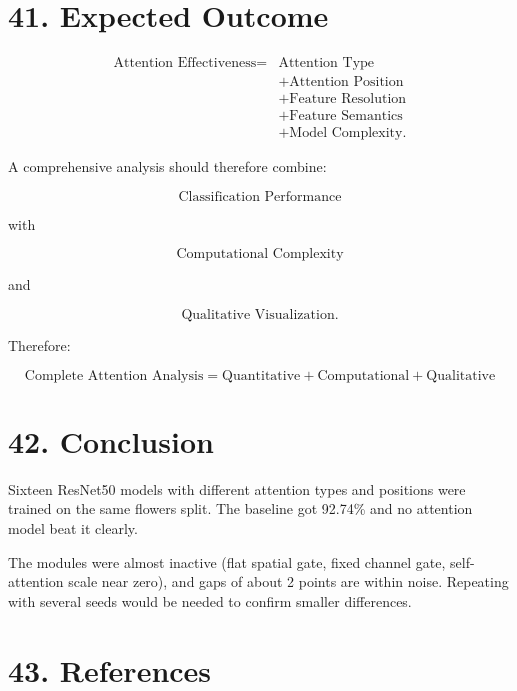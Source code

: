\documentclass[10pt]{article}
\begin{document}
\section*{41. Expected Outcome}

\[
\boxed{
\begin{aligned}
\text{Attention Effectiveness}
={}&
\text{Attention Type}\\
&+
\text{Attention Position}\\
&+
\text{Feature Resolution}\\
&+
\text{Feature Semantics}\\
&+
\text{Model Complexity}.
\end{aligned}
}
\]

A comprehensive analysis should therefore combine:

\[
\boxed{
\text{Classification Performance}
}
\]

with

\[
\boxed{
\text{Computational Complexity}
}
\]

and

\[
\boxed{
\text{Qualitative Visualization}.
}
\]

Therefore:

\[
\boxed{
\text{Complete Attention Analysis}
=
\text{Quantitative}
+
\text{Computational}
+
\text{Qualitative}
}
\]

\section*{42. Conclusion}

Sixteen ResNet50 models with different attention types and positions were trained on the same flowers split. The baseline got 92.74\% and no attention model beat it clearly.

The modules were almost inactive (flat spatial gate, fixed channel gate, self-attention scale near zero), and gaps of about 2 points are within noise. Repeating with several seeds would be needed to confirm smaller differences.

\section*{43. References}
\end{document}
